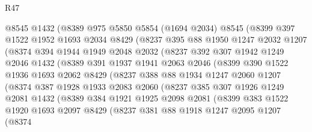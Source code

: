 \begin{lexlean}{R47}
\begin{coremodule}
          @8545
          @1432
          (@8389
            @975
            @5850
            @5854
            (@1694 @2034)
            @8545
            (@8399
              @397
              @1522
              @1952
              @1693
              @2034
              @8429
              (@8237
                @395
                @88
                @1950
                @1247
                @2032
                @1207
                (@8374
                  @394
                  @1944
                  @1949
                  @2048
                  @2032
                  (@8237
                    @392
                    @307
                    @1942
                    @1249
                    @2046
                    @1432
                    (@8389
                      @391
                      @1937
                      @1941
                      @2063
                      @2046
                      (@8399
                        @390
                        @1522
                        @1936
                        @1693
                        @2062
                        @8429
                        (@8237
                          @388
                          @88
                          @1934
                          @1247
                          @2060
                          @1207
                          (@8374
                            @387
                            @1928
                            @1933
                            @2083
                            @2060
                            (@8237
                              @385
                              @307
                              @1926
                              @1249
                              @2081
                              @1432
                              (@8389
                                @384
                                @1921
                                @1925
                                @2098
                                @2081
                                (@8399
                                  @383
                                  @1522
                                  @1920
                                  @1693
                                  @2097
                                  @8429
                                  (@8237
                                    @381
                                    @88
                                    @1918
                                    @1247
                                    @2095
                                    @1207
                                    (@8374

\end{coremodule}
\end{lexlean}
